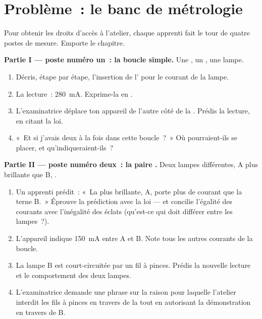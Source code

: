 \section{Problème~: le banc de métrologie}

\begin{problem}\label{pb:g8:intensity-ammeter:1}
Pour obtenir les droits d'accès à l'atelier, chaque apprenti fait le
tour de quatre postes de mesure. Emporte le chapitre.

\medskip\noindent\textbf{Partie I --- poste numéro un~: la boucle
simple.}
Une , un , une lampe.
\begin{enumerate}
  \item Décris, étape par étape, l'insertion de l' pour
         le courant de la lampe.
  \item La lecture~: \qty{280}{mA}. Exprime-la en .
  \item L'examinatrice déplace ton appareil de l'autre côté de la
        . Prédis la lecture, en citant la loi.
  \item «~Et si j'avais deux  à la fois dans cette
        boucle~?~» Où pourraient-ils se placer, et qu'indiqueraient-ils~?
\end{enumerate}

\medskip\noindent\textbf{Partie II --- poste numéro deux~: la paire
.}
Deux lampes différentes, A plus brillante que B, .
\begin{enumerate}[resume]
  \item Un apprenti prédit~: «~La plus brillante, A, porte plus de
        courant que la terne B.~» Éprouve la prédiction avec la
        loi --- et concilie l'égalité des courants avec l'inégalité
        des éclats (qu'est-ce qui doit différer entre les lampes~?).
  \item L'appareil indique \qty{150}{mA} entre A et B. Note tous
        les autres courants de la boucle.
  \item La lampe B est court-circuitée par un fil à pinces. Prédis
        la nouvelle lecture et le comportement des deux lampes.
  \item L'examinatrice demande une phrase sur la raison pour
        laquelle l'atelier interdit les fils à pinces en travers de
        la \emph{} tout en autorisant la démonstration en
        travers de B.
\end{enumerate}


\end{problem}
